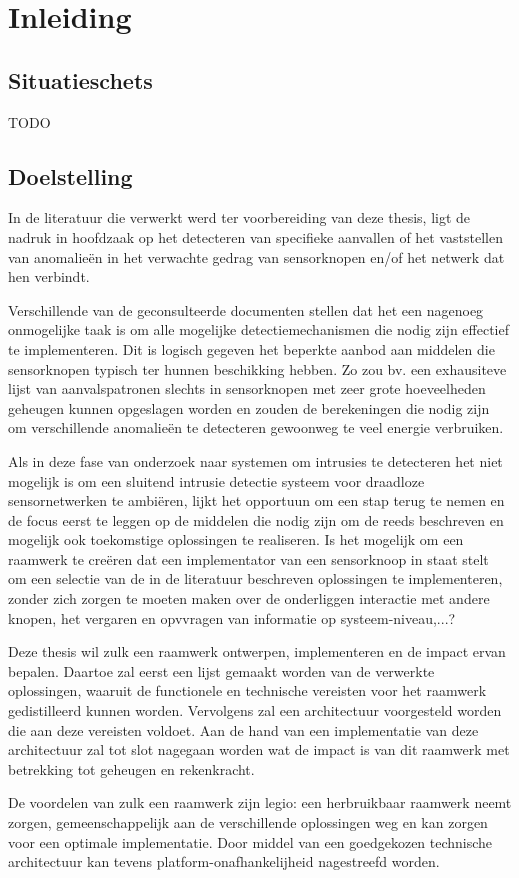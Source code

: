 
\chapter{Inleiding}
\label{inleiding}

\section{Situatieschets}

TODO

\section{Doelstelling}

In de literatuur die verwerkt werd ter voorbereiding van deze thesis, ligt de
nadruk in hoofdzaak op het detecteren van specifieke aanvallen of het
vaststellen van anomalie\"en in het verwachte gedrag van sensorknopen en/of het
netwerk dat hen verbindt.

Verschillende van de geconsulteerde documenten stellen dat het een nagenoeg
onmogelijke taak is om alle mogelijke detectiemechanismen die nodig zijn
effectief te implementeren. Dit is logisch gegeven het beperkte aanbod aan
middelen die sensorknopen typisch ter hunnen beschikking hebben. Zo zou bv. een
exhausiteve lijst van aanvalspatronen slechts in sensorknopen met zeer grote
hoeveelheden geheugen kunnen opgeslagen worden en zouden de berekeningen die
nodig zijn om verschillende anomalie\"en te detecteren gewoonweg te veel energie
verbruiken.

Als in deze fase van onderzoek naar systemen om intrusies te detecteren het
niet mogelijk is om een sluitend intrusie detectie systeem voor draadloze
sensornetwerken te ambi\"eren, lijkt het opportuun om een stap terug te nemen en
de focus eerst te leggen op de middelen die nodig zijn om de reeds beschreven
en mogelijk ook toekomstige oplossingen te realiseren. Is het mogelijk om een
raamwerk te cre\"eren dat een implementator van een sensorknoop in staat stelt om
een selectie van de in de literatuur beschreven oplossingen te implementeren,
zonder zich zorgen te moeten maken over de onderliggen interactie met andere
knopen, het vergaren en opvvragen van informatie op systeem-niveau,...?

Deze thesis wil zulk een raamwerk ontwerpen, implementeren en de impact ervan
bepalen. Daartoe zal eerst een lijst gemaakt worden van de verwerkte
oplossingen, waaruit de functionele en technische vereisten voor het raamwerk
gedistilleerd kunnen worden. Vervolgens zal een architectuur voorgesteld worden
die aan deze vereisten voldoet. Aan de hand van een implementatie van deze
architectuur zal tot slot nagegaan worden wat de impact is van dit raamwerk met
betrekking tot geheugen en rekenkracht.

De voordelen van zulk een raamwerk zijn legio: een herbruikbaar raamwerk neemt
zorgen, gemeenschappelijk aan de verschillende oplossingen weg en kan zorgen
voor een optimale implementatie. Door middel van een goedgekozen technische
architectuur kan tevens platform-onafhankelijheid nagestreefd worden.

